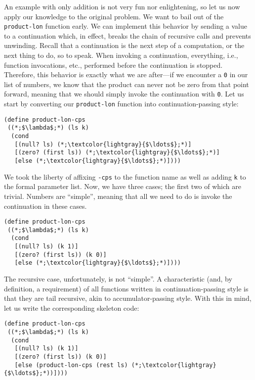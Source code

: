 An example with only addition is not very fun nor enlightening, so let us now apply our knowledge to the original problem. We want to bail out of the \texttt{product-lon} function early. We can implement this behavior by sending a value to a continuation which, in effect, breaks the chain of recursive calls and prevents unwinding. Recall that a continuation is the next step of a computation, or the next thing to do, so to speak. When invoking a continuation, everything, i.e., function invocations, etc., performed before the continuation is stopped. Therefore, this behavior is exactly what we are after---if we encounter a \texttt{0} in our list of numbers, we know that the product can never not be zero from that point forward, meaning that we should simply invoke the continuation with \texttt{0}. Let us start by converting our \texttt{product-lon} function into continuation-passing style:
\begin{cl}[]{}\begin{lstlisting}[language=MyScheme]
(define product-lon-cps
 ((*;$\lambda$;*) (ls k)
  (cond
   [(null? ls) (*;\textcolor{lightgray}{$\ldots$};*)]
   [(zero? (first ls)) (*;\textcolor{lightgray}{$\ldots$};*)]
   [else (*;\textcolor{lightgray}{$\ldots$};*)])))
\end{lstlisting}\end{cl}
We took the liberty of affixing \texttt{-cps} to the function name as well as adding \texttt{k} to the formal parameter list. Now, we have three cases; the first two of which are trivial. Numbers are ``simple'', meaning that all we need to do is invoke the continuation in these cases.
\begin{cl}[]{}\begin{lstlisting}[language=MyScheme]
(define product-lon-cps
 ((*;$\lambda$;*) (ls k)
  (cond
   [(null? ls) (k 1)]
   [(zero? (first ls)) (k 0)]
   [else (*;\textcolor{lightgray}{$\ldots$};*)])))
\end{lstlisting}\end{cl}
The recursive case, unfortunately, is not ``simple''. A characteristic (and, by definition, a requirement) of all functions written in continuation-passing style is that they are tail recursive, akin to accumulator-passing style. With this in mind, let us write the corresponding skeleton code:
\begin{cl}[]{}\begin{lstlisting}[language=MyScheme]
(define product-lon-cps
 ((*;$\lambda$;*) (ls k)
  (cond
   [(null? ls) (k 1)]
   [(zero? (first ls)) (k 0)]
   [else (product-lon-cps (rest ls) (*;\textcolor{lightgray}{$\ldots$};*))])))
\end{lstlisting}\end{cl}

